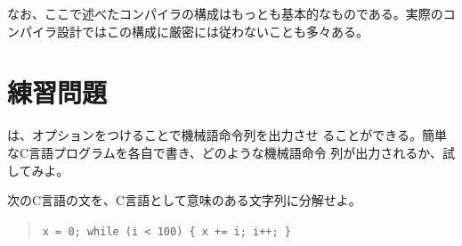 なお、ここで述べたコンパイラの構成はもっとも基本的なものである。実際のコ
ンパイラ設計ではこの構成に厳密には従わないことも多々ある。

\section{練習問題}

\begin{exercise}
\label{ex:intro01}
 は、オプションをつけることで機械語命令列を出力させ
 ることができる。簡単なC言語プログラムを各自で書き、どのような機械語命令
 列が出力されるか、試してみよ。
\end{exercise}
\begin{exercise}
\label{ex:intro02}
 次のC言語の文を、C言語として意味のある文字列に分解せよ。
 \begin{quote}
  \verb|x = 0; while (i < 100) { x += i; i++; }|
 \end{quote}
\end{exercise}
